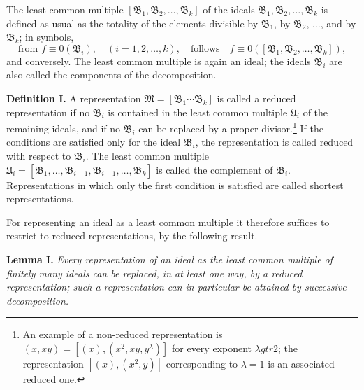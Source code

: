 \documentclass[11pt]{article}
\newcommand{\ideal}[1]{\mathfrak{#1}}
\begin{document}
The least common multiple $[\ideal B_1,\ideal B_2,\ldots,\ideal B_k]$ of the ideals $\ideal B_1,\ideal B_2,\ldots,\ideal B_k$ is defined as usual as the totality of the elements divisible by $\ideal B_1$, by $\ideal B_2$, $\ldots$, and by $\ideal B_k$; in symbols,
\[
 \text{from } f\equiv0(\ideal B_i),\quad (i=1,2,\ldots,k),
 \quad\text{follows}\quad
 f\equiv0([\ideal B_1,\ideal B_2,\ldots,\ideal B_k]),
\]
and conversely. The least common multiple is again an ideal; the ideals $\ideal B_i$ are also called the components of the decomposition.

\textbf{Definition I.} A representation $\ideal M=[\ideal B_1\cdots\ideal B_k]$ is called a reduced representation if no $\ideal B_i$ is contained in the least common multiple $\ideal U_i$ of the remaining ideals, and if no $\ideal B_i$ can be replaced by a proper divisor.\footnote{An example of a non-reduced representation is $(x,xy)=[(x),(x^2,xy,y^\lambda)]$ for every exponent $\lambda
gtr 2$; the representation $[(x),(x^2,y)]$ corresponding to $\lambda=1$ is an associated reduced one.} If the conditions are satisfied only for the ideal $\ideal B_i$, the representation is called reduced with respect to $\ideal B_i$. The least common multiple $\ideal U_i=[\ideal B_1,\ldots,\ideal B_{i-1},\ideal B_{i+1},\ldots,\ideal B_k]$ is called the complement of $\ideal B_i$. Representations in which only the first condition is satisfied are called shortest representations.

For representing an ideal as a least common multiple it therefore suffices to restrict to reduced representations, by the following result.

\textbf{Lemma I.} \emph{Every representation of an ideal as the least common multiple of finitely many ideals can be replaced, in at least one way, by a reduced representation; such a representation can in particular be attained by successive decomposition.}
\end{document}

